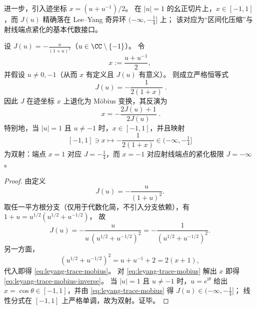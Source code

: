 进一步，引入迹坐标 \(x=(u+u^{-1})/2\)。
在 \(|u|=1\) 的幺正切片上，\(x\in[-1,1]\)，而 \(J(u)\) 精确落在 Lee--Yang 奇异环 \((-\infty,-\tfrac14]\) 上；
该对应为“区间化压缩”与射线端点紧化的基本代数接口。

\begin{theorem}\label{thm:leyang-trace-mobius-invertibility}
设 \(J(u)=-\frac{u}{(1+u)^2}\)（\(u\in\CC\setminus\{-1\}\)）。
令
\[
x:=\frac{u+u^{-1}}{2},
\]
并假设 \(u\neq 0,-1\)（从而 \(x\) 有定义且 \(J(u)\) 有意义）。
则成立严格恒等式
\begin{equation}\label{eq:leyang-trace-mobius}
\boxed{\;
J(u)=-\frac{1}{2(1+x)}\; }.
\end{equation}
因此 \(J\) 在迹坐标 \(x\) 上退化为 Möbius 变换，其反演为
\begin{equation}\label{eq:leyang-trace-mobius-inverse}
\boxed{\;
x=-\frac{2J(u)+1}{2J(u)}\; }.
\end{equation}
特别地，当 \(|u|=1\) 且 \(u\neq -1\) 时，\(x\in[-1,1]\)，并且映射
\[
[-1,1]\ni x\longmapsto -\frac{1}{2(1+x)}\in(-\infty,-\tfrac14]
\]
为双射：端点 \(x=1\) 对应 \(J=-\tfrac14\)，而 \(x=-1\) 对应射线端点的紧化极限 \(J=-\infty\)。
\end{theorem}

\begin{proof}
由定义
\[
J(u)=-\frac{u}{(1+u)^2}.
\]
取任一平方根分支（仅用于代数化简，不引入分支依赖），有
\(
1+u=u^{1/2}(u^{1/2}+u^{-1/2})
\)，
故
\[
J(u)=-\frac{u}{u\,(u^{1/2}+u^{-1/2})^2}=-\frac{1}{(u^{1/2}+u^{-1/2})^2}.
\]
另一方面，
\[
(u^{1/2}+u^{-1/2})^2=u+u^{-1}+2=2(x+1),
\]
代入即得 \eqref{eq:leyang-trace-mobius}。
对 \eqref{eq:leyang-trace-mobius} 解出 \(x\) 即得 \eqref{eq:leyang-trace-mobius-inverse}。
当 \(|u|=1\) 且 \(u\neq -1\) 时，\(u=e^{\mathrm{i}\theta}\) 给出 \(x=\cos\theta\in[-1,1]\)，并由 \eqref{eq:leyang-trace-mobius} 得 \(J(u)\in(-\infty,-\tfrac14]\)；
线性分式在 \([-1,1]\) 上严格单调，故为双射。证毕。
\end{proof}

